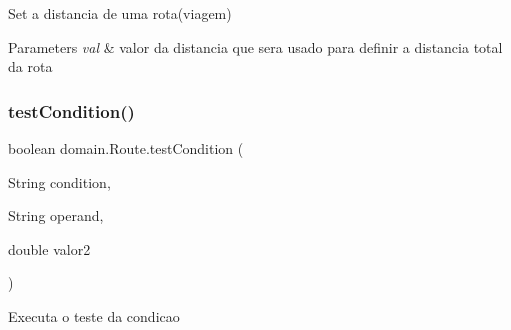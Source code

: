 Set a distancia de uma rota(viagem)


\begin{DoxyParams}{Parameters}
{\em val} & valor da distancia que sera usado para definir a distancia total da rota \\
\hline
\end{DoxyParams}
\mbox{\label{classdomain_1_1_route_aa130fcfb95d38f93081a7f30438fb1e9}} 
\subsubsection{\texorpdfstring{test\+Condition()}{testCondition()}}
{\footnotesize\ttfamily boolean domain.\+Route.\+test\+Condition (\begin{DoxyParamCaption}\item[{String}]{condition,  }\item[{String}]{operand,  }\item[{double}]{valor2 }\end{DoxyParamCaption})}

Executa o teste da condicao


